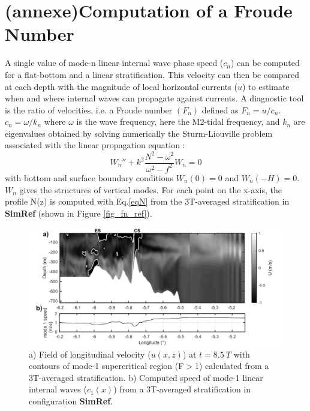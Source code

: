 \section{(annexe)Computation of a Froude Number}
\label{app_Froude}
A single value of mode-n linear internal wave phase speed ($c_n$) can be computed for a flat-bottom and a linear stratification. This velocity can then be compared at each depth with the magnitude of local horizontal currents ($u$) to estimate when and where internal waves can propagate against currents. A diagnostic tool is the ratio of velocities, i.e. a Froude number $(F_n)$ defined as $F_n= u /c_n$. $c_n=\omega / k_n $ where $\omega$ is the wave frequency, here the M2-tidal frequency, and
$k_n$ are eigenvalues obtained by solving numerically the Sturm-Liouville problem associated with the linear propagation equation \citep{Gill1982}:
\begin{equation}
 W_n'' + k^2 \frac{N^2 - \omega^2}{\omega ^2 - f^2}W_n = 0
\end{equation}
with bottom and surface boundary conditions $W_n(0) = 0$ and $W_n(-H) = 0$. $W_n$ gives the structures of vertical modes. For each point on the x-axis, the profile N(z) is computed with Eq.\ref{eqN} from the 3T-averaged stratification in \textbf{SimRef} (shown in Figure \ref{fig_fn_ref}).

\begin{figure}[!h]
\centering
\includegraphics[width=1\linewidth]{./GBR2D/figure14.png}
\caption{a) Field of longitudinal velocity ($u (x,z)$) at $t = 8.5\ T$ with contours of mode-1 supercritical region (F$>$1) calculated from a 3T-averaged stratification. b) Computed speed of mode-1 linear internal waves ($c_1 (x)$) from a 3T-averaged stratification in configuration \textbf{SimRef}.}
\label{fig_annexeF}
\end{figure}

